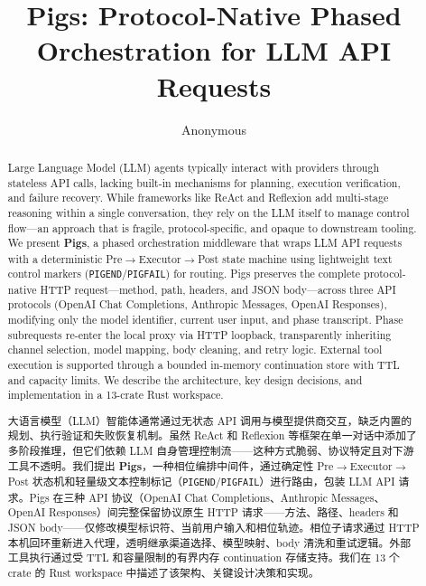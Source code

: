 \documentclass[10pt]{article}
\title{Pigs: Protocol-Native Phased Orchestration for LLM API Requests}
\author{Anonymous}
\date{}
\begin{document}
\maketitle

\begin{abstract}
Large Language Model (LLM) agents typically interact with providers through stateless API calls, lacking built-in mechanisms for planning, execution verification, and failure recovery. While frameworks like ReAct and Reflexion add multi-stage reasoning within a single conversation, they rely on the LLM itself to manage control flow---an approach that is fragile, protocol-specific, and opaque to downstream tooling. We present \textbf{Pigs}, a phased orchestration middleware that wraps LLM API requests with a deterministic Pre$\rightarrow$Executor$\rightarrow$Post state machine using lightweight text control markers (\texttt{PIGEND}/\texttt{PIGFAIL}) for routing. Pigs preserves the complete protocol-native HTTP request---method, path, headers, and JSON body---across three API protocols (OpenAI Chat Completions, Anthropic Messages, OpenAI Responses), modifying only the model identifier, current user input, and phase transcript. Phase subrequests re-enter the local proxy via HTTP loopback, transparently inheriting channel selection, model mapping, body cleaning, and retry logic. External tool execution is supported through a bounded in-memory continuation store with TTL and capacity limits. We describe the architecture, key design decisions, and implementation in a 13-crate Rust workspace.
\begin{chinese}
大语言模型（LLM）智能体通常通过无状态 API 调用与模型提供商交互，缺乏内置的规划、执行验证和失败恢复机制。虽然 ReAct 和 Reflexion 等框架在单一对话中添加了多阶段推理，但它们依赖 LLM 自身管理控制流——这种方式脆弱、协议特定且对下游工具不透明。我们提出 \textbf{Pigs}，一种相位编排中间件，通过确定性 Pre$\rightarrow$Executor$\rightarrow$Post 状态机和轻量级文本控制标记（\texttt{PIGEND}/\texttt{PIGFAIL}）进行路由，包装 LLM API 请求。Pigs 在三种 API 协议（OpenAI Chat Completions、Anthropic Messages、OpenAI Responses）间完整保留协议原生 HTTP 请求——方法、路径、headers 和 JSON body——仅修改模型标识符、当前用户输入和相位轨迹。相位子请求通过 HTTP 本机回环重新进入代理，透明继承渠道选择、模型映射、body 清洗和重试逻辑。外部工具执行通过受 TTL 和容量限制的有界内存 continuation 存储支持。我们在 13 个 crate 的 Rust workspace 中描述了该架构、关键设计决策和实现。
\end{chinese}
\end{abstract}










\end{document}
